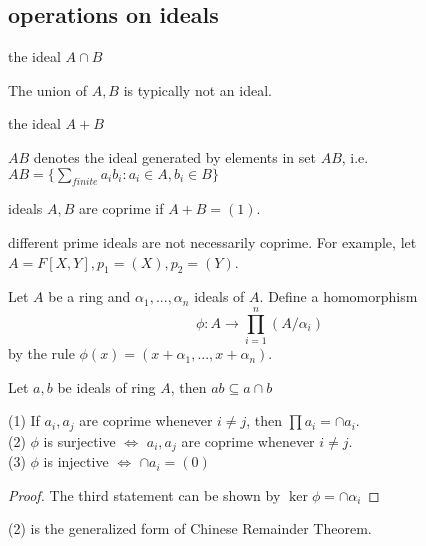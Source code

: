 \documentclass[11pt,fleqn]{book} %
\begin{document}
\begin{CJK}{UTF8}{gkai}
\section{operations on ideals}
\begin{definition}
	[intersection] the ideal $A \cap B$
\end{definition}
\begin{remark}
	The union of $A, B$ is typically not an ideal.
\end{remark}

\begin{definition}
	[sum] the ideal $A + B$
\end{definition}

\begin{definition}
	[product] $AB$ denotes the ideal generated by elements in set $AB$, i.e. $AB = \{\sum_{finite}a_ib_i : a_i \in A, b_i \in B\}$	
\end{definition}

\begin{definition}
	[coprime] ideals $A,B$ are coprime if $A + B = (1)$.
\end{definition}
\begin{remark}
	different prime ideals are not necessarily coprime. For example, let $A = F[X, Y], p_1 = (X), p_2 = (Y)$.	
\end{remark}

\begin{definition}
	Let $A$ be a ring and $\alpha_1, ... ,\alpha_n$ ideals of $A$. Define a homomorphism
\[\phi: A \to \prod_{i=1}^n(A/\alpha_i)\]
by the rule $\phi(x) = (x+\alpha_1,...,x+\alpha_n)$.

\end{definition}
\begin{remark}
	Let $a, b$ be ideals of ring $A$, then $ab \subseteq a \cap b$
\end{remark}

\begin{proposition}
	(1) If $a_i, a_j$ are coprime whenever $i\neq j$, then $\prod a_i = \cap a_i$. \\
	(2) $\phi$ is surjective $\iff$ $a_i, a_j$ are coprime whenever $i\neq j$. \\
	(3) $\phi$ is injective $\iff$ $\cap a_i = (0)$
\end{proposition}
\begin{proof}
	The third statement can be shown by $\ker \phi = \cap \alpha_i$
\end{proof}
\begin{remark}
	(2) is the generalized form of Chinese Remainder Theorem.	
\end{remark}


\end{CJK}
\end{document}
